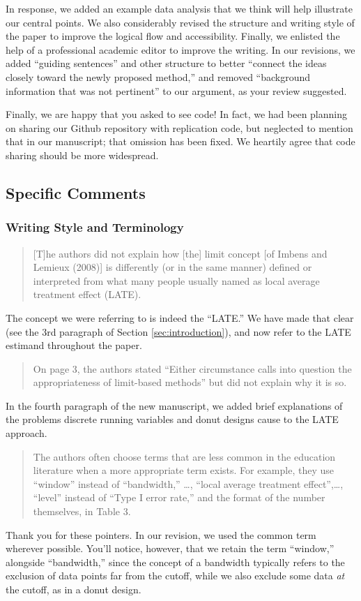\documentclass[12pt]{article}
\begin{document}
In response, we added an example data
analysis that we think will help illustrate our central points. We
also considerably revised the structure and writing style of the paper
to improve the logical flow and accessibility. Finally, we enlisted
the help of a professional academic editor to improve the writing. In
our revisions, we added ``guiding sentences'' and other structure to
better ``connect the ideas closely toward the newly proposed method,''
and removed ``background information that was not pertinent'' to our
argument, as your review suggested.

Finally, we are happy that you asked to see code! In fact, we had been
planning on sharing our Github repository with replication code, but
neglected to mention that in our manuscript; that omission has been
fixed. We heartily agree that code sharing should be more widespread.

\subsection{Specific Comments}
\subsubsection{Writing Style and Terminology}
\begin{quote}
[T]he authors did not explain how [the] limit concept [of Imbens and
Lemieux (2008)] is differently (or in the same manner) defined or
interpreted from what many people usually named as local average
treatment effect (LATE).
\end{quote}
The concept we were referring to is indeed the ``LATE.'' We have made
that clear (see the 3rd paragraph of Section \ref{sec:introduction}), and now refer to the
LATE estimand throughout the paper.

\begin{quote}
On page 3, the authors stated “Either circumstance calls into question
the appropriateness of limit-based methods” but did not explain why it
is so.
\end{quote}
In the fourth paragraph of the new manuscript, we added brief
explanations of the problems discrete running variables and donut
designs cause to the LATE approach.




\begin{quote}
The authors often choose terms that are less common in the education
literature when a more appropriate term exists. For example, they use
“window” instead of “bandwidth,” \dots, “local average treatment
effect”,\dots, “level” instead of “Type I error
rate,” and the format of the number themselves, in Table 3.
\end{quote}
Thank you for these pointers. In our revision, we used the common term
wherever possible. You'll notice, however, that we retain the term
``window,'' alongside ``bandwidth,'' since the concept of a bandwidth
typically refers to the exclusion of data points far from the cutoff,
while we also exclude some data \emph{at} the cutoff, as in a donut
design.
\end{document}
